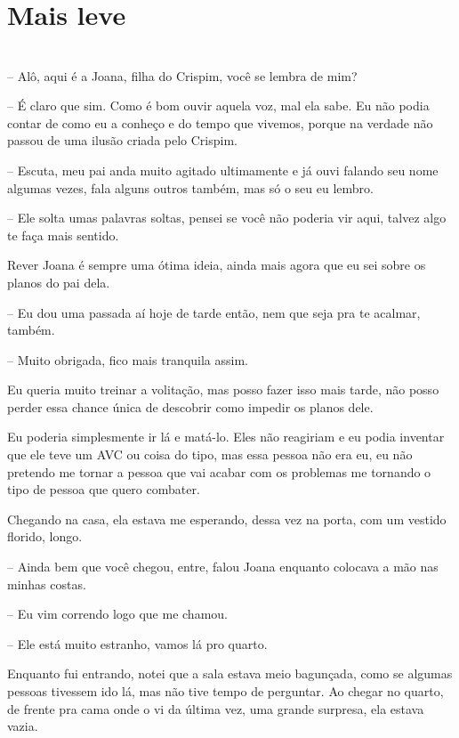 
\newpage


\ifdefined\useChapters
\chapter{Mais leve}
\else
\chapter{}
\fi
-- Alô, aqui é a Joana, filha do Crispim, você se lembra de mim?

-- É claro que sim. Como é bom ouvir aquela voz, mal ela sabe. Eu não podia contar de como eu a conheço e do tempo que vivemos, porque na verdade não passou de uma ilusão criada pelo Crispim.

-- Escuta, meu pai anda muito agitado ultimamente e já ouvi falando seu nome algumas vezes, fala alguns outros também, mas só o seu eu lembro.

-- Ele solta umas palavras soltas, pensei se você não poderia vir aqui, talvez algo te faça mais sentido.

Rever Joana é sempre uma ótima ideia, ainda mais agora que eu sei sobre os planos do pai dela.

-- Eu dou uma passada aí hoje de tarde então, nem que seja pra te acalmar, também.

-- Muito obrigada, fico mais tranquila assim.

Eu queria muito treinar a volitação, mas posso fazer isso mais tarde, não posso perder essa chance única de descobrir como impedir os planos dele.

Eu poderia simplesmente ir lá e matá-lo. Eles não reagiriam e eu podia inventar que ele teve um AVC ou coisa do tipo, mas essa pessoa não era eu, eu não pretendo me tornar a pessoa que vai acabar com os problemas me tornando o tipo de pessoa que quero combater.

Chegando na casa, ela estava me esperando, dessa vez na porta, com um vestido florido, longo.

-- Ainda bem que você chegou, entre, falou Joana enquanto colocava a mão nas minhas costas.

-- Eu vim correndo logo que me chamou.

-- Ele está muito estranho, vamos lá pro quarto.

Enquanto fui entrando, notei que a sala estava meio bagunçada, como se algumas pessoas tivessem ido lá, mas não tive tempo de perguntar. Ao chegar no quarto, de frente pra cama onde o vi da última vez, uma grande surpresa, ela estava vazia.

